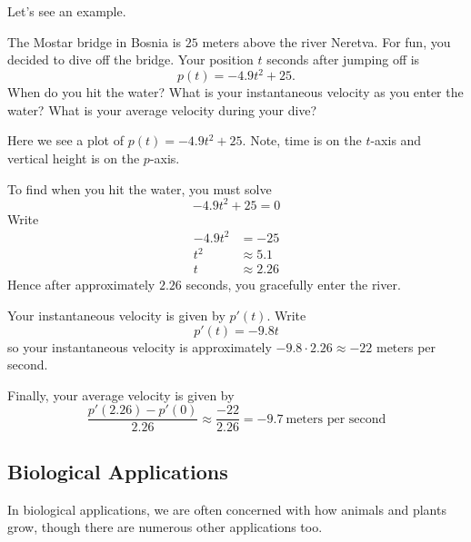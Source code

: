 Let's see an example.

\begin{example}
The Mostar bridge in Bosnia is $25$ meters above the river
Neretva. For fun, you decided to dive off the bridge. Your position
$t$ seconds after jumping off is
\[
p(t) = -4.9t^2 + 25.
\]
When do you hit the water? What is your instantaneous velocity as you
enter the water?  What is your average velocity during your dive?
\end{example}
\begin{marginfigure}
\caption{Here we see a plot of $p(t) = -4.9t^2 + 25$. Note, time is on
  the $t$-axis and vertical height is on the $p$-axis.}
\end{marginfigure}
\begin{solution}
To find when you hit the water, you must solve
\[
-4.9t^2 + 25 = 0
\]
Write
\begin{align*}
-4.9t^2 &= -25 \\
t^2 &\approx 5.1 \\ 
t &\approx 2.26
\end{align*}
Hence after approximately $2.26$ seconds, you gracefully enter the
river.

Your instantaneous velocity is given by $p'(t)$. Write
\[
p'(t) = -9.8t
\]
so your instantaneous velocity is approximately $-9.8\cdot 2.26\approx
-22$ meters per second.

Finally, your average velocity is given by
\[
\frac{p'(2.26) -p'(0)}{2.26} \approx \frac{-22}{2.26} =
-9.7~\text{meters per second}
\]
\end{solution}





\subsection*{Biological Applications}

In biological applications, we are often concerned with how animals
and plants grow, though there are numerous other applications too.

